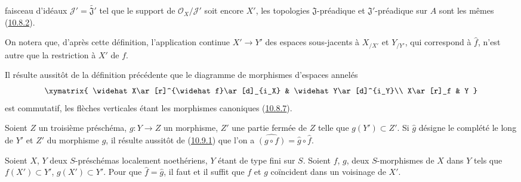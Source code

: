 \begin{env}[10.9.1]

faisceau d'idéaux
$\mathscr{J}'=\widetilde{\mathfrak{J}'}$ tel que le support de
$\mathscr{O}_X/\mathscr{J}'$ soit encore $X'$, les topologies
$\mathfrak{J}$-préadique et $\mathfrak{J}'$-préadique sur $A$ sont les
mêmes (\hyperref[I.10.8.2-fr]{10.8.2}).

On notera que, d'après cette définition, l'application continue
$X'\to Y'$ des espaces sous-jacents à $X_{/X'}$ et $Y_{/Y'}$, qui
correspond à $\widehat f$, n'est autre que la restriction à $X'$ de $f$.
\end{env}

\begin{env}[10.9.2]
\label{I.10.9.2-fr}
Il résulte aussitôt de la définition précédente que le diagramme de
morphismes d'espaces annelés
\[
  \label{I.10.9.2.1-fr}
  \xymatrix{
    \widehat X\ar[r]^{\widehat f}\ar[d]_{i_X} &
    \widehat Y\ar[d]^{i_Y}\\
    X\ar[r]_f &
    Y
  }
\]
est commutatif, les flèches verticales étant les morphismes canoniques
(\hyperref[I.10.8.7-fr]{10.8.7}).
\end{env}

\begin{env}[10.9.3]
\label{I.10.9.3-fr}
Soient $Z$ un troisième préschéma, $g:Y\to Z$ un morphisme, $Z'$ une
partie fermée de $Z$ telle que $g(Y')\subset Z'$. Si $\widehat g$ désigne
le complété le long de $Y'$ et $Z'$ du morphisme $g$, il résulte aussitôt
de (\hyperref[I.10.9.1-fr]{10.9.1}) que l'on a
$\widehat{(g\circ f)}=\widehat g\circ\widehat f$.
\end{env}

\begin{proposition}[10.9.4]
\label{I.10.9.4-fr}
Soient $X$, $Y$ deux $S$-préschémas localement noethériens, $Y$ étant de
type fini sur $S$. Soient $f$, $g$, deux $S$-morphismes de $X$ dans $Y$
tels que $f(X')\subset Y'$, $g(X')\subset Y'$. Pour que
$\widehat f=\widehat g$, il faut et il suffit que $f$ et $g$ coïncident
dans un voisinage de $X'$.
\end{proposition}

